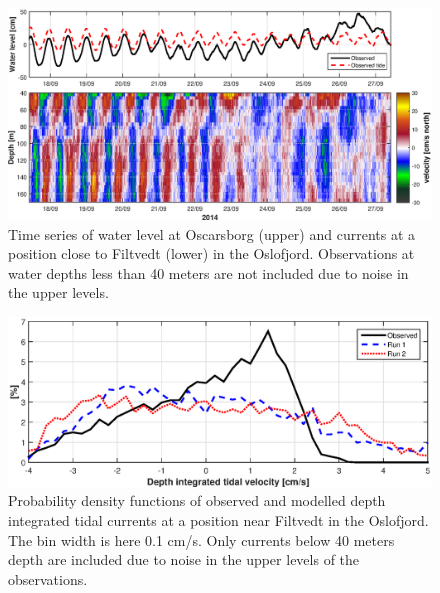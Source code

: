 \begin{figure}[!t]
\centering
\includegraphics[width=\textwidth]{fig_Filtvedt_timeseries}
\caption{Time series of water level at Oscarsborg (upper) and currents at a position close to Filtvedt (lower) in the Oslofjord. Observations at water depths less than 40 meters are not included due to noise in the upper levels.}
\label{fig:Filtvedt_timeseries}
\end{figure}

\begin{figure}[!t]
\centering
\includegraphics[width=\textwidth]{fig_Filtvedt_pdf}
\caption{Probability density functions of observed and modelled depth integrated tidal currents at a position near Filtvedt in the Oslofjord. The bin width is here 0.1 cm/s. Only currents below 40 meters depth are included due to noise in the upper levels of the observations.}
\label{fig:Filtvedt_pdf}
\end{figure}


